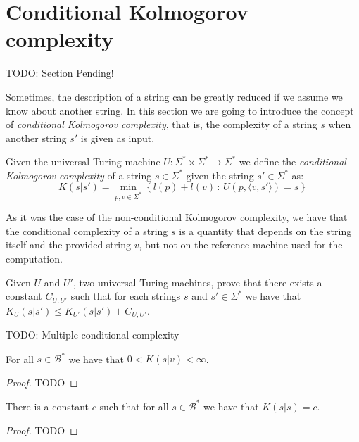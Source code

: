 %
%

\section{Conditional Kolmogorov complexity}

{\color{red} TODO: Section Pending!}

Sometimes, the description of a string can be greatly reduced if we assume we know about another string. In this section we are going to introduce the concept of \emph{conditional Kolmogorov complexity}, that is, the complexity of a string $s$ when another string $s'$ is given as input.

\begin{definition}
Given the universal Turing machine $U:\Sigma^{\ast}\times\Sigma^{\ast}\rightarrow\Sigma^{\ast}$ we define the \emph{conditional Kolmogorov complexity} of a string $s\in\Sigma^{\ast}$ given the string $s'\in\Sigma^{\ast}$ as:
\[
K(s|s')=\min_{p,v\in\Sigma^{\ast}}\left\{l(p) + l(v)\,:\, U(p,\langle v, s' \rangle)=s\right\}
\]
\end{definition}

As it was the case of the non-conditional Kolmogorov complexity, we have that the conditional complexity of a string $s$ is a quantity that depends on the string itself and the provided string $v$, but not on the reference machine used for the computation.

\begin{exercise}
Given $U$ and $U'$, two universal Turing machines, prove that there exists a constant $C_{U, U'}$ such that for each strings $s$ and $s' \in \Sigma^{\ast}$ we have that $K_{U}(s|s') \leq K_{U'}(s|s') + C_{U, U'}$.
\end{exercise}

{\color{red} TODO: Multiple conditional complexity}

\begin{proposition}
For all $s\in\mathcal{B}^{\ast}$ we have that $0 < K(s | v) < \infty$.
\end{proposition}
\begin{proof}
{\color{red} TODO}
\end{proof}


\begin{proposition}
There is a constant $c$ such that for all $s\in\mathcal{B}^{\ast}$ we have that $K(s | s ) = c$.
\end{proposition}
\label{prop:self_conditional}
\begin{proof}
{\color{red} TODO}
\end{proof}

